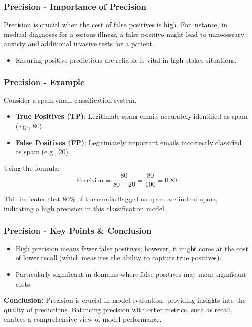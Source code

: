 \documentclass{beamer}
\begin{document}
\begin{frame}[fragile]
    \frametitle{Precision - Importance of Precision}
    Precision is crucial when the cost of false positives is high. 
    For instance, in medical diagnoses for a serious illness, a false positive might lead to unnecessary anxiety and additional invasive tests for a patient.

    \begin{itemize}
        \item Ensuring positive predictions are reliable is vital in high-stakes situations.
    \end{itemize}
\end{frame}

\begin{frame}[fragile]
    \frametitle{Precision - Example}
    Consider a spam email classification system.
    \begin{itemize}
        \item \textbf{True Positives (TP)}: Legitimate spam emails accurately identified as spam (e.g., 80).
        \item \textbf{False Positives (FP)}: Legitimately important emails incorrectly classified as spam (e.g., 20).
    \end{itemize}
    
    Using the formula:
    \begin{equation}
        \text{Precision} = \frac{80}{80 + 20} = \frac{80}{100} = 0.80
    \end{equation}
    
    This indicates that 80\% of the emails flagged as spam are indeed spam, indicating a high precision in this classification model.
\end{frame}

\begin{frame}[fragile]
    \frametitle{Precision - Key Points & Conclusion}
    \begin{itemize}
        \item High precision means fewer false positives; however, it might come at the cost of lower recall (which measures the ability to capture true positives).
        \item Particularly significant in domains where false positives may incur significant costs.
    \end{itemize}

    \textbf{Conclusion:}
    Precision is crucial in model evaluation, providing insights into the quality of predictions. Balancing precision with other metrics, such as recall, enables a comprehensive view of model performance.
\end{frame}
\end{document}
